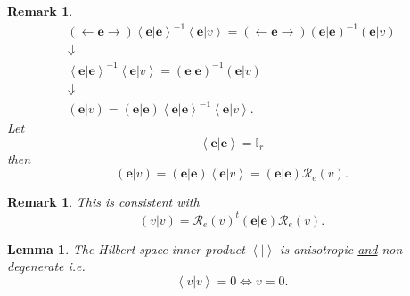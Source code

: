 \documentclass[aps,preprint]{revtex4}%
\newtheorem{lemma}[theorem]{Lemma}
\newtheorem{remark}[theorem]{Remark}
\begin{document}
\begin{remark}%
\begin{gather}
\left(  \longleftarrow\mathbf{e\rightarrow}\right)  \left\langle \left.
\mathbf{e}\right\vert \mathbf{e}\right\rangle ^{-1}\left\langle \left.
\mathbf{e}\right\vert v\right\rangle =\left(  \longleftarrow
\mathbf{e\rightarrow}\right)  \left(  \left.  \mathbf{e}\right\vert
\mathbf{e}\right)  ^{-1}\left(  \left.  \mathbf{e}\right\vert v\right) \\
\Downarrow\\
\left\langle \left.  \mathbf{e}\right\vert \mathbf{e}\right\rangle
^{-1}\left\langle \left.  \mathbf{e}\right\vert v\right\rangle =\left(
\left.  \mathbf{e}\right\vert \mathbf{e}\right)  ^{-1}\left(  \left.
\mathbf{e}\right\vert v\right) \\
\Downarrow\\
\left(  \left.  \mathbf{e}\right\vert v\right)  =\left(  \left.
\mathbf{e}\right\vert \mathbf{e}\right)  \left\langle \left.  \mathbf{e}%
\right\vert \mathbf{e}\right\rangle ^{-1}\left\langle \left.  \mathbf{e}%
\right\vert v\right\rangle .
\end{gather}
Let
\begin{equation}
\left\langle \left.  \mathbf{e}\right\vert \mathbf{e}\right\rangle
=\mathbb{I}_{r}%
\end{equation}
then
\begin{equation}
\left(  \left.  \mathbf{e}\right\vert v\right)  =\left(  \left.
\mathbf{e}\right\vert \mathbf{e}\right)  \left\langle \left.  \mathbf{e}%
\right\vert v\right\rangle =\left(  \left.  \mathbf{e}\right\vert
\mathbf{e}\right)  \mathcal{R}_{e}\left(  v\right)  .
\end{equation}

\end{remark}

\begin{remark}
This is consistent with
\begin{equation}
\left(  \left.  v\right\vert v\right)  =\mathcal{R}_{e}\left(  v\right)
^{t}\left(  \left.  \mathbf{e}\right\vert \mathbf{e}\right)  \mathcal{R}%
_{e}\left(  v\right)  .
\end{equation}

\end{remark}

\begin{lemma}
The Hilbert space inner product $\left\langle \left.  {}\right\vert
\right\rangle $ is \emph{anisotropic \underline{\emph{and}} non degenerate
i.e. }%
\begin{equation}
\left\langle \left.  v\right\vert v\right\rangle =0\Leftrightarrow v=0.
\end{equation}

\end{lemma}
\end{document}
